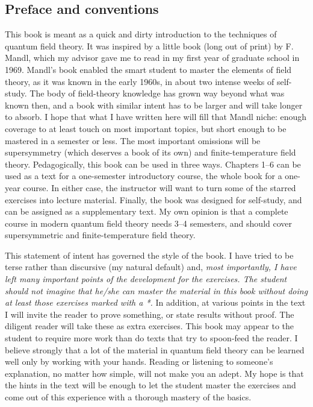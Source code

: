 \subsection{Preface and conventions}

This book is meant as a quick and dirty introduction to the techniques of
quantum field theory.  It was inspired by a little book (long out of print) by
F. Mandl, which my advisor gave me to read in my first year of graduate school
in 1969.  Mandl's book enabled the smart student to master the elements of
field theory, as it was known in the early 1960s, in about two intense weeks of
self-study.  The body of field-theory knowledge has grown way beyond what was
known then, and a book with similar intent has to be larger and will take
longer to absorb.  I hope that what I have written here will fill that Mandl
niche: enough coverage to at least touch on most important topics, but short
enough to be mastered in a semester or less.  The most important omissions
will be supersymmetry (which deserves a book of its own) and finite-temperature
field theory.  Pedagogically, this book can be used in three ways.  Chapters
1--6 can be used as a text for a one-semester introductory course, the whole
book for a one-year course.  In either case, the instructor will want to turn
some of the starred exercises into lecture material.  Finally, the book was
designed for self-study, and can be assigned as a supplementary text.  My own
opinion is that a complete course in modern quantum field theory needs 3--4
semesters, and should cover supersymmetric and finite-temperature field theory.

This statement of intent has governed the style of the book.  I have tried to
be terse rather than discursive (my natural default) and, \emph{most
importantly, I have left many important points of the development for the
exercises.  The student should not imagine that he/she can master the material
in this book without doing at least those exercises marked with a *.}  In
addition, at various points in the text I will invite the reader to prove
something, or state results without proof.  The diligent reader will take
these as extra exercises.  This book may appear to the student to require more
work than do texts that try to spoon-feed the reader.  I believe strongly that
a lot of the material in quantum field theory can be learned well only by
working with your hands.  Reading or listening to someone's explanation, no
matter how simple, will not make you an adept.  My hope is that the hints in
the text will be enough to let the student master the exercises and come out
of this experience with a thorough mastery of the basics.


